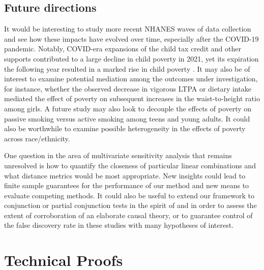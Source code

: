 \documentclass[12pt,leqno,titlepage]{amsart}
\newcommand{\1}{\mathbbm{1}}
\begin{document}
\begin{bibunit}
\subsection{Future directions}
It would be interesting to study more recent NHANES waves of data collection and see how these impacts have evolved over time, especially after the COVID-19 pandemic. Notably, COVID-era expansions of the child tax credit and other supports contributed to a large decline in child poverty in 2021, yet its expiration the following year resulted in a marked rise in child poverty \citep{bitler2023effects}. It may also be of interest to examine potential mediation among the outcomes under investigation, for instance, whether the observed decrease in vigorous LTPA or dietary intake mediated the effect of poverty on subsequent increases in the waist-to-height ratio among girls. A future study may also look to decouple the effects of poverty on passive smoking versus active smoking among teens and young adults. It could also be worthwhile to examine possible heterogeneity in the effects of poverty across race/ethnicity.

One question in the area of multivariate sensitivity analysis that remains unresolved is how to quantify the closeness of particular linear combinations and what distance metrics would be most appropriate. New insights could lead to finite sample guarantees for the performance of our method and new means to evaluate competing methods. It could also be useful to extend our framework to conjunction or partial conjunction tests in the spirit of \cite{benjamini2008screening} and \cite{karmakar2020assessment} in order to assess the extent of corroboration of an elaborate causal theory, or to guarantee control of the false discovery rate \citep{benjamini1995controlling} in these studies with many hypotheses of interest.



\section{Technical Proofs} \label{appendix:proofs}























\end{bibunit}
\end{document}
